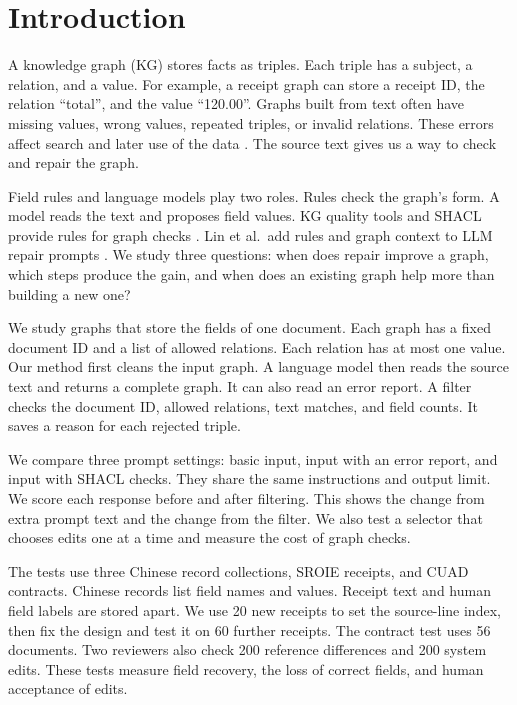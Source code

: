 \section{Introduction}
\label{sec:introduction}

A knowledge graph (KG) stores facts as triples. Each triple has a subject,
a relation, and a value. For example, a receipt graph can store a receipt
ID, the relation ``total'', and the value ``120.00''. Graphs built from
text often have missing values, wrong values, repeated triples, or invalid
relations. These errors affect search and later use of the data
\citep{ref_ji2021,ref_paulheim2017}. The source text gives us a way to check
and repair the graph.

Field rules and language models play two roles. Rules check the graph's
form. A model reads the text and proposes field values. KG quality tools
and SHACL provide rules for graph checks
\citep{ref_zaveri2016,ref_kontokostas2014,ref_shacl2017}.
Lin et al.\ add rules and graph context to LLM repair prompts
\citep{ref_lin2025}. We study three questions: when does repair improve a
graph, which steps produce the gain, and when does an existing graph help
more than building a new one?

We study graphs that store the fields of one document. Each graph has a
fixed document ID and a list of allowed relations. Each relation has at
most one value. Our method first cleans the input graph. A language model
then reads the source text and returns a complete graph. It can also read
an error report. A filter checks the document ID, allowed relations, text
matches, and field counts. It saves a reason for each rejected triple.

We compare three prompt settings: basic input, input with an error report,
and input with SHACL checks. They share the same instructions and output
limit. We score each response before and after filtering. This shows the
change from extra prompt text and the change from the filter. We also test
a selector that chooses edits one at a time and measure the cost of graph
checks.

The tests use three Chinese record collections, SROIE receipts, and CUAD
contracts. Chinese records list field names and values. Receipt text and
human field labels are stored apart. We use 20 new receipts to set the
source-line index, then fix the design and test it on 60 further receipts.
The contract test uses 56 documents. Two reviewers also check 200
reference differences and 200 system edits. These tests measure field
recovery, the loss of correct fields, and human acceptance of edits.

